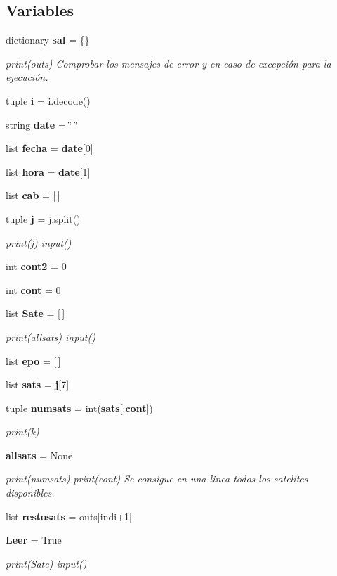 \subsection*{Variables}
\begin{DoxyCompactItemize}
\item 
dictionary {\bf sal} = \{\}
\begin{DoxyCompactList}\small\item\em print(outs) Comprobar los mensajes de error y en caso de excepción para la ejecución. \end{DoxyCompactList}\item 
tuple {\bf i} = i.\-decode()
\item 
string {\bf date} = \char`\"{} \char`\"{}
\item 
list {\bf fecha} = {\bf date}[0]
\item 
list {\bf hora} = {\bf date}[1]
\item 
list {\bf cab} = [$\,$]
\item 
tuple {\bf j} = j.\-split()
\begin{DoxyCompactList}\small\item\em print(j) input() \end{DoxyCompactList}\item 
int {\bf cont2} = 0
\item 
int {\bf cont} = 0
\item 
list {\bf Sate} = [$\,$]
\begin{DoxyCompactList}\small\item\em print(allsats) input() \end{DoxyCompactList}\item 
list {\bf epo} = [$\,$]
\item 
list {\bf sats} = {\bf j}[7]
\item 
tuple {\bf numsats} = int({\bf sats}[\-:{\bf cont}])
\begin{DoxyCompactList}\small\item\em print(k) \end{DoxyCompactList}\item 
{\bf allsats} = None
\begin{DoxyCompactList}\small\item\em print(numsats) print(cont) Se consigue en una linea todos los satelites disponibles. \end{DoxyCompactList}\item 
list {\bf restosats} = outs[indi+1]
\item 
{\bf Leer} = True
\begin{DoxyCompactList}\small\item\em print(\-Sate) input() \end{DoxyCompactList}\end{DoxyCompactItemize}



